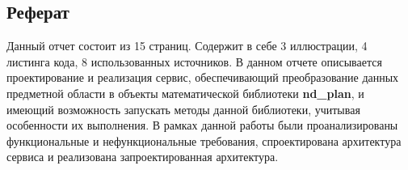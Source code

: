 \subsection*{\Large{Реферат}}
Данный отчет состоит из 15 страниц.
Содержит в себе 3 иллюстрации, 4 листинга кода, 8 использованных источников.
В данном отчете описывается проектирование и реализация сервис, обеспечивающий
преобразование данных предметной области в объекты математической библиотеки \textbf{nd\_plan},
и имеющий возможность запускать методы данной библиотеки, учитывая особенности их выполнения.
В рамках данной работы были проанализированы функциональные и нефункциональные требования, спроектирована
архитектура сервиса и реализована запроектированная архитектура.